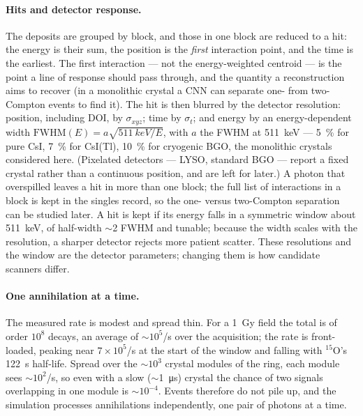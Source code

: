 \documentclass[11pt]{article}
\begin{document}
\paragraph{Hits and detector response.}
The deposits are grouped by block, and those in one block are reduced to a hit: the energy
is their sum, the position is the \emph{first} interaction point, and the time is the
earliest. The first interaction --- not the energy-weighted centroid --- is the point a
line of response should pass through, and the quantity a reconstruction aims to recover
(in a monolithic crystal a CNN can separate one- from two-Compton events to find it). The
hit is then blurred by the detector resolution: position, including DOI, by $\sigma_{xyz}$;
time by $\sigma_t$; and energy by an energy-dependent width
$\mathrm{FWHM}(E)=a\sqrt{\SI{511}{keV}/E}$, with $a$ the FWHM at \SI{511}{keV} ---
\SI{5}{\percent} for pure CsI, \SI{7}{\percent} for CsI(Tl), \SI{10}{\percent} for
cryogenic BGO, the monolithic crystals considered here. (Pixelated detectors --- LYSO,
standard BGO --- report a fixed crystal rather than a continuous position, and are left for
later.) A photon that overspilled leaves a hit in more than one block; the full list of
interactions in a block is kept in the singles record, so the one- versus two-Compton
separation can be studied later. A hit is kept if its energy falls in a symmetric window
about \SI{511}{keV}, of half-width $\sim$2 FWHM and tunable; because the width scales with
the resolution, a sharper detector rejects more patient scatter. These resolutions and the
window are the detector parameters; changing them is how candidate scanners differ.

\paragraph{One annihilation at a time.}
The measured rate is modest and spread thin. For a \SI{1}{Gy} field the total is of order
$10^{8}$ decays, an average of $\sim$$10^{5}$/s over the acquisition; the rate is
front-loaded, peaking near $7\times10^{5}$/s at the start of the window and falling with
$^{15}$O's \SI{122}{s} half-life. Spread over the $\sim$$10^{3}$ crystal modules of the
ring, each module sees $\sim$$10^{2}$/s, so even with a slow ($\sim$\SI{1}{\micro s})
crystal the chance of two signals overlapping in one module is $\sim$$10^{-4}$. Events
therefore do not pile up, and the simulation processes annihilations independently, one
pair of photons at a time.
\end{document}
